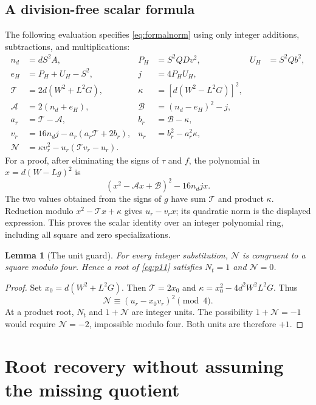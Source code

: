 \documentclass[11pt,a4paper]{article}
\newtheorem{lemma}[theorem]{Lemma}
\theoremstyle{definition}
\theoremstyle{remark}
\numberwithin{equation}{section}
\begin{document}
\subsection{A division-free scalar formula}
\label{sec:scalar}

The following evaluation specifies \eqref{eq:formalnorm} using only
integer additions, subtractions, and multiplications:
\begin{align*}
 n_d&=dS^2A,&P_H&=S^2QDv^2,&U_H&=S^2Qb^2,\\
 e_H&=P_H+U_H-S^2,& j&=4P_HU_H,\\
 \mathcal T&=2d(W^2+L^2G),& \kappa&=[d(W^2-L^2G)]^2,\\
 \mathcal A&=2(n_d+e_H),&\mathcal B&=(n_d-e_H)^2-j,\\
 a_r&=\mathcal T-\mathcal A,&b_r&=\mathcal B-\kappa,\\
 v_r&=16n_dj-a_r(a_r\mathcal T+2b_r),
 &u_r&=b_r^2-a_r^2\kappa,\\
 \mathcal N&=\kappa v_r^2-u_r(\mathcal T v_r-u_r).
\end{align*}
For a proof, after eliminating the signs of $\tau$ and $f$, the
polynomial in $x=d(W-Lg)^2$ is
\[
 (x^2-\mathcal A x+\mathcal B)^2-16n_dj x.
\]
The two values obtained from the signs of $g$ have sum $\mathcal T$
and product $\kappa$. Reduction modulo
$x^2-\mathcal T x+\kappa$ gives $u_r-v_rx$; its quadratic norm
is the displayed expression. This proves the scalar identity over an
integer polynomial ring, including all square and zero specializations.

\begin{lemma}[The unit guard]
\label{lem:guard}
For every integer substitution, $\mathcal N$ is congruent to a square
modulo four. Hence a root of \eqref{eq:p11} satisfies
$N_t=1$ and $\mathcal N=0$.
\end{lemma}
\begin{proof}
Set $x_0=d(W^2+L^2G)$. Then
$\mathcal T=2x_0$ and
$\kappa=x_0^2-4d^2W^2L^2G$. Thus
\[
 \mathcal N\equiv(u_r-x_0v_r)^2\pmod4.
\]
At a product root, $N_t$ and $1+\mathcal N$ are integer units.
The possibility $1+\mathcal N=-1$ would require
$\mathcal N=-2$, impossible modulo four. Both units are therefore $+1$.
\end{proof}

\section{Root recovery without assuming the missing quotient}
\label{sec:root-recovery}
\end{document}
